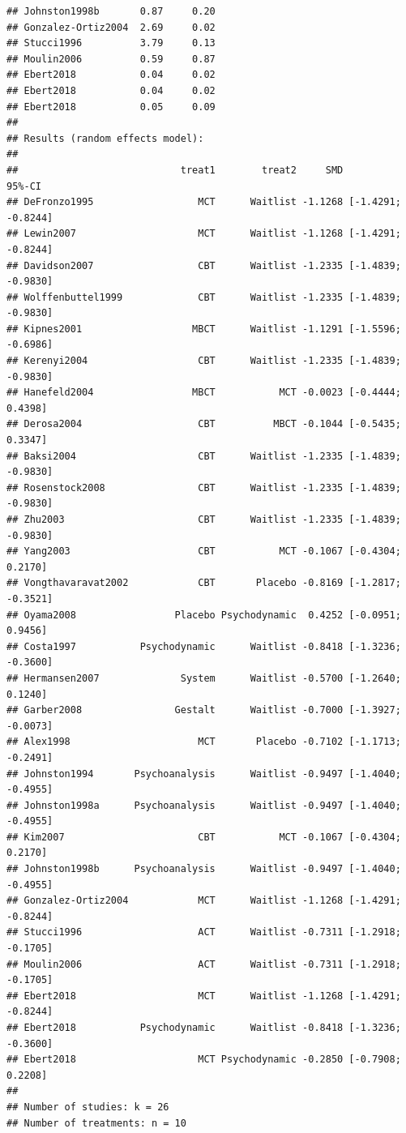 \documentclass[]{book}
\begin{document}
\begin{verbatim}
## Johnston1998b       0.87     0.20
## Gonzalez-Ortiz2004  2.69     0.02
## Stucci1996          3.79     0.13
## Moulin2006          0.59     0.87
## Ebert2018           0.04     0.02
## Ebert2018           0.04     0.02
## Ebert2018           0.05     0.09
## 
## Results (random effects model):
## 
##                            treat1        treat2     SMD             95%-CI
## DeFronzo1995                  MCT      Waitlist -1.1268 [-1.4291; -0.8244]
## Lewin2007                     MCT      Waitlist -1.1268 [-1.4291; -0.8244]
## Davidson2007                  CBT      Waitlist -1.2335 [-1.4839; -0.9830]
## Wolffenbuttel1999             CBT      Waitlist -1.2335 [-1.4839; -0.9830]
## Kipnes2001                   MBCT      Waitlist -1.1291 [-1.5596; -0.6986]
## Kerenyi2004                   CBT      Waitlist -1.2335 [-1.4839; -0.9830]
## Hanefeld2004                 MBCT           MCT -0.0023 [-0.4444;  0.4398]
## Derosa2004                    CBT          MBCT -0.1044 [-0.5435;  0.3347]
## Baksi2004                     CBT      Waitlist -1.2335 [-1.4839; -0.9830]
## Rosenstock2008                CBT      Waitlist -1.2335 [-1.4839; -0.9830]
## Zhu2003                       CBT      Waitlist -1.2335 [-1.4839; -0.9830]
## Yang2003                      CBT           MCT -0.1067 [-0.4304;  0.2170]
## Vongthavaravat2002            CBT       Placebo -0.8169 [-1.2817; -0.3521]
## Oyama2008                 Placebo Psychodynamic  0.4252 [-0.0951;  0.9456]
## Costa1997           Psychodynamic      Waitlist -0.8418 [-1.3236; -0.3600]
## Hermansen2007              System      Waitlist -0.5700 [-1.2640;  0.1240]
## Garber2008                Gestalt      Waitlist -0.7000 [-1.3927; -0.0073]
## Alex1998                      MCT       Placebo -0.7102 [-1.1713; -0.2491]
## Johnston1994       Psychoanalysis      Waitlist -0.9497 [-1.4040; -0.4955]
## Johnston1998a      Psychoanalysis      Waitlist -0.9497 [-1.4040; -0.4955]
## Kim2007                       CBT           MCT -0.1067 [-0.4304;  0.2170]
## Johnston1998b      Psychoanalysis      Waitlist -0.9497 [-1.4040; -0.4955]
## Gonzalez-Ortiz2004            MCT      Waitlist -1.1268 [-1.4291; -0.8244]
## Stucci1996                    ACT      Waitlist -0.7311 [-1.2918; -0.1705]
## Moulin2006                    ACT      Waitlist -0.7311 [-1.2918; -0.1705]
## Ebert2018                     MCT      Waitlist -1.1268 [-1.4291; -0.8244]
## Ebert2018           Psychodynamic      Waitlist -0.8418 [-1.3236; -0.3600]
## Ebert2018                     MCT Psychodynamic -0.2850 [-0.7908;  0.2208]
## 
## Number of studies: k = 26
## Number of treatments: n = 10

\end{verbatim}
\end{document}
